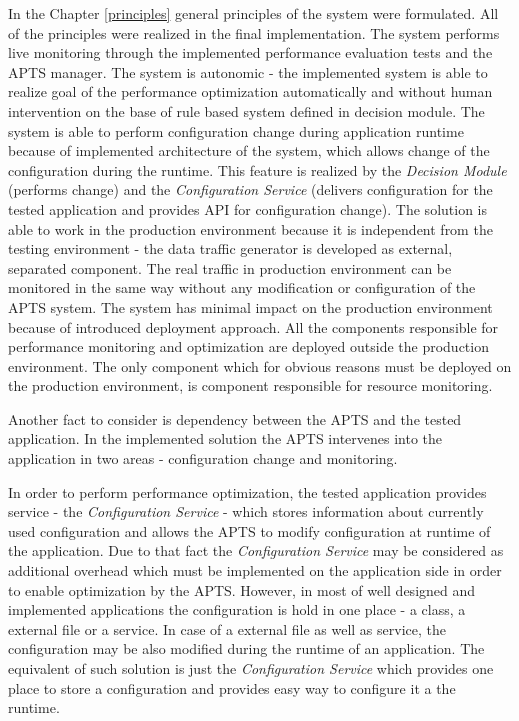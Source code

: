\documentclass[12pt,a4paper]{article}
\begin{document}
In the Chapter \ref{principles} general principles of the system were formulated. All of the principles were realized in the final implementation. The system performs live monitoring through the implemented performance evaluation tests and the APTS manager. The system is autonomic - the implemented system is able to realize goal of the performance optimization automatically and without human intervention on the base of rule based system defined in decision module. The system is able to perform configuration change during application runtime because of implemented architecture of the system, which allows change of the configuration during the runtime. This feature is realized by the \textit{Decision Module} (performs change) and the \textit{Configuration Service} (delivers configuration for the tested application and provides API for configuration change). The solution is able to work in the production environment because it is independent from the testing environment - the data traffic generator is developed as external, separated  component. The real traffic in production environment can be monitored in the same way without any modification or configuration of the APTS system. The system has minimal impact on the production environment because of introduced deployment approach. All the components responsible for performance monitoring and optimization are deployed outside the production environment. The only component which for obvious reasons must be deployed on the production environment, is component responsible for resource monitoring.  

Another fact to consider is dependency between the APTS and the tested application. In the implemented solution the APTS intervenes into the application in two areas - configuration change and monitoring. 

In order to perform performance optimization, the tested application provides service - the \textit{Configuration Service} - which stores information about currently used configuration and allows the APTS to modify configuration at runtime of the application. Due to that fact the \textit{Configuration Service} may be considered as additional overhead which must be implemented on the application side in order to enable optimization by the APTS. However, in most of well designed and implemented applications the configuration is hold in one place - a class, a external file or a service. In case of a external file as well as service, the configuration may be also modified during the runtime of an application. The equivalent of such solution is just the \textit{Configuration Service} which provides one place to store a configuration and provides easy way to configure it a the runtime.  
\end{document}
